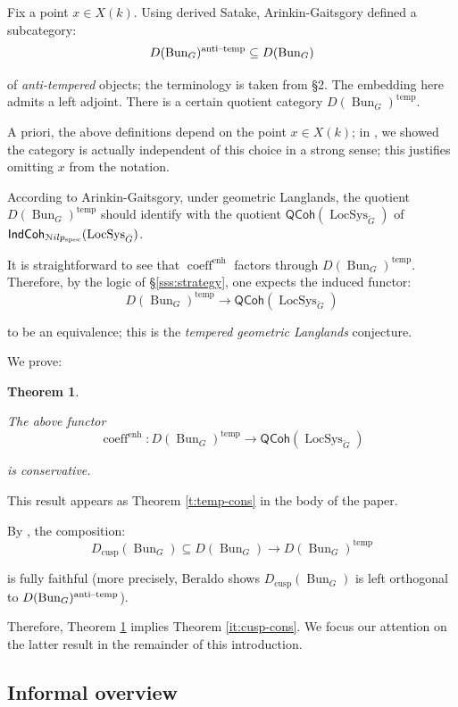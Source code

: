 \documentclass[reqno,11pt]{amsart}
\numberwithin{equation}{subsection}
\newtheorem{introthm}{Theorem}
\theoremstyle{remark}
\newcommand{\sN}{{\EuScript N}}
\newcommand{\on}{\operatorname}
\newcommand{\mathendash}{\text{\textendash}}
\newcommand{\Bun}{\on{Bun}}
\newcommand{\LocSys}{\on{LocSys}}
\newcommand{\IndCoh}{\mathsf{IndCoh}}
\newcommand{\QCoh}{\mathsf{QCoh}}
\renewcommand{\subset}{\subseteq}
\newcommand{\coeff}{\on{coeff}}
\newcommand{\enh}{\on{enh}}
\newcommand{\temp}{\on{temp}}
\newcommand{\cusp}{\on{cusp}}
\newcommand{\at}{\on{anti}\!\mathendash\!\on{temp}}
\newcommand{\Nilp}{\sN ilp}
\begin{document}
Fix a point $x \in X(k)$. Using derived Satake, Arinkin-Gaitsgory
defined a subcategory:
%
\[
D(\Bun_G)^{\at} \subset D(\Bun_G)
\]

\noindent of \emph{anti-tempered} objects; the terminology is taken
from \cite{dario-ramanujan} \S 2. The embedding here admits
a left adjoint. There is a certain quotient category $D(\Bun_G)^{\temp}$.

A priori, the above definitions depend on the point $x \in X(k)$; in
\cite{independence}, we showed the category is actually independent of
this choice in a strong sense; this justifies omitting $x$ from the notation.

According to Arinkin-Gaitsgory, under geometric Langlands, the quotient
$D(\Bun_G)^{\temp}$ should identify with the quotient
$\QCoh(\LocSys_{\check{G}})$ of $\IndCoh_{\Nilp_{\on{spec}}}(\LocSys_{\check{G}})$.


It is straightforward to see that $\coeff^{\enh}$ factors through
$D(\Bun_G)^{\temp}$. Therefore, by the logic of \S \ref{sss:strategy}, 
one expects the induced functor:
%
\[
D(\Bun_G)^{\temp} \to \QCoh(\LocSys_{\check{G}})
\] 

\noindent to be an equivalence; this is the \emph{tempered geometric
Langlands} conjecture.

We prove:

\begin{introthm}\label{it:temp-cons}

The above functor
%
\[
\coeff^{\enh}:
D(\Bun_G)^{\temp} \to \QCoh(\LocSys_{\check{G}})
\]

\noindent is conservative.

\end{introthm}

This result appears as Theorem \ref{t:temp-cons} in the body of the paper. 

By \cite{dario-ramanujan}, the composition: 
%
\[
D_{\cusp}(\Bun_G) \subset D(\Bun_G) \to  
D(\Bun_G)^{\temp}
\]

\noindent is fully faithful (more precisely, Beraldo shows
$D_{\cusp}(\Bun_G)$ is left orthogonal to $D(\Bun_G)^{\at}$).

Therefore, Theorem \ref{it:temp-cons} implies Theorem \ref{it:cusp-cons}.
We focus our attention on the latter result in the remainder of
this introduction.

\subsection{Informal overview}
\end{document}
